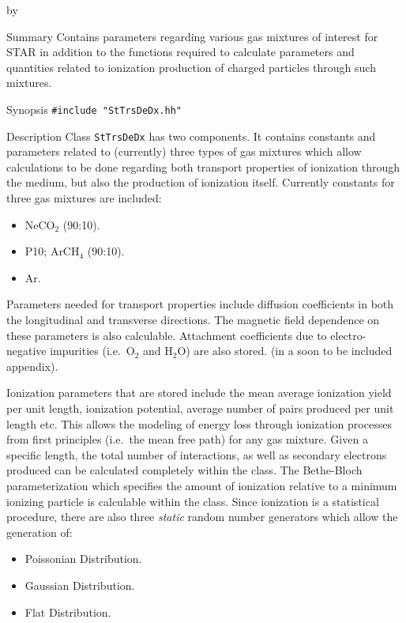 \documentclass[twoside]{article}
\newcommand{\comp}[1]{\texttt{#1}}%
\newcommand{\entrylabel}[1]{\mbox{\textbf{{#1}}}\hfil}%
\newenvironment{entry}
{\begin{list}{}%
    {\renewcommand{\makelabel}{\entrylabel}%
     \setlength{\labelwidth}{90pt}%
     \setlength{\leftmargin}{\labelwidth}
     \advance\leftmargin by \labelsep%
      }%
    }%
  {\end{list}}
\newcommand{\Entrylabel}[1]%
{\raisebox{0pt}[1ex][0pt]{\makebox[\labelwidth][l]%
    {\parbox[t]{\labelwidth}{\hspace{0pt}\textbf{{#1}}}}}}
\newenvironment{Entry}%
{\renewcommand{\entrylabel}{\Entrylabel}\begin{entry}}%
  {\end{entry}}
\begin{document}
\begin{Entry}
\item[Summary]
  Contains parameters regarding various gas mixtures of interest
  for STAR in addition to the functions required to calculate
  parameters and quantities related to ionization production of
  charged particles through such mixtures.

\item[Synopsis]
  \verb+#include "StTrsDeDx.hh"+\\

\item[Description]
Class \comp{StTrsDeDx} has two components.  It contains constants and
parameters related to (currently) three types of gas mixtures which
allow calculations to be done regarding both transport properties
of ionization through the medium, but also the production of ionization
itself.  Currently constants for three gas mixtures are included:
\begin{itemize}
  \item NeCO$_{2}$ (90:10).
  \item P10; ArCH$_{4}$ (90:10).
  \item Ar.
\end{itemize}
Parameters needed for transport properties include diffusion coefficients
in both the longitudinal and transverse directions.  The magnetic field
dependence on these parameters is also calculable.  Attachment coefficients
due to electro-negative impurities (i.e.~O$_{2}$ and H$_{2}$O) are also
stored.  (in a soon to be included appendix).

Ionization parameters that are stored include the mean average ionization
yield per unit length, ionization potential, average number of pairs
produced per unit length etc.  This allows the modeling of energy loss
through ionization processes from first principles (i.e.~the mean free path)
for any gas mixture.  Given a specific length, the total number of
interactions, as well as secondary electrons produced can be calculated
completely within the class.  The Bethe-Bloch parameterization which
specifies the amount of ionization relative to a minimum ionizing particle
is calculable within the class.  Since ionization is a statistical procedure,
there are also three {\em static} random number generators which allow
the generation of:
\begin{itemize}
  \item Poissonian Distribution.
  \item Gaussian Distribution.
  \item Flat Distribution.
\end{itemize}


\end{Entry}
\end{document}

